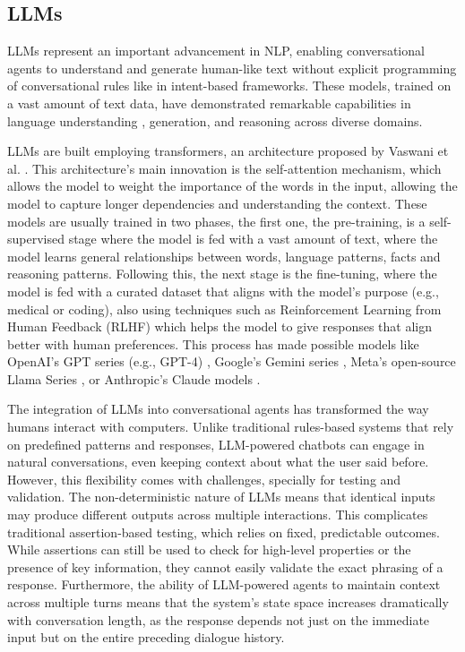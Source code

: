 \subsection{\aclp{LLM}}

\aclp{LLM} represent an important advancement in \acl{NLP},
enabling conversational agents to understand and generate human-like text
without explicit programming of conversational rules like in intent-based frameworks.
These models, trained on a vast amount of text data,
have demonstrated remarkable capabilities in
language understanding \autocite{liEnhancingNaturalLanguage2024}, generation, and reasoning across diverse domains.

\aclp{LLM} are built employing transformers,
an architecture proposed by Vaswani et al. \autocite{vaswaniAttentionAllYou2017}.
This architecture's main innovation is the self-attention mechanism,
which allows the model to weight the importance of the words in the input,
allowing the model to capture longer dependencies and understanding the context.
These models are usually trained in two phases,
the first one, the pre-training,
is a self-supervised stage where the model
is fed with a vast amount of text,
where the model learns 
general relationships between words,
language patterns, facts and reasoning patterns.
Following this, the next stage is the fine-tuning,
where the model is fed with a curated dataset
that aligns with the model's purpose (e.g., medical or coding),
also using techniques such as
Reinforcement Learning from Human Feedback (RLHF)
which helps the model to give responses
that align better with human preferences.
This process has made possible models like
OpenAI's GPT series (e.g., GPT-4) \autocite{OpenAI2025},
Google's Gemini series \autocite{GoogleGemini},
Meta's open-source Llama Series \autocite{touvronLLaMAOpenEfficient2023},
or Anthropic's Claude models \autocite{ClaudeAnthropic}.


The integration of \acp{LLM} into conversational agents
has transformed the way humans interact with computers.
Unlike traditional rules-based systems that rely on predefined patterns and responses,
\ac{LLM}-powered chatbots can engage in natural conversations,
even keeping context about what the user said before.
However, this flexibility comes with challenges,
specially for testing and validation.
The non-deterministic nature of \acp{LLM} means that
identical inputs may produce different outputs across multiple interactions.
This complicates traditional assertion-based testing,
which relies on fixed, predictable outcomes.
While assertions can still be used
to check for high-level properties or the presence of key information,
they cannot easily validate the exact phrasing of a response.
Furthermore, the ability of \ac{LLM}-powered agents
to maintain context across multiple turns
means that the system's state space increases dramatically with conversation length,
as the response depends not just on the immediate input
but on the entire preceding dialogue history.

